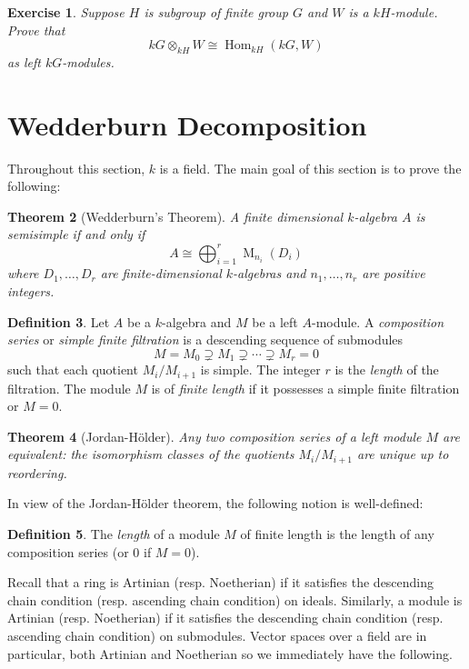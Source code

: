 \documentclass[12pt]{article}
\theoremstyle{plain}
\newtheorem{theorem}{Theorem}[section]
\newtheorem{exercise}[theorem]{Exercise}
\theoremstyle{definition}
\newtheorem{definition}[theorem]{Definition}
\theoremstyle{remark}
\numberwithin{equation}{section}
\begin{document}
\begin{exercise}
Suppose $H$ is subgroup of finite group $G$ and $W$ is a $kH$-module.
Prove that
\[
kG \otimes_{kH} W \cong \operatorname{Hom}_{kH}(kG,W)
\]
as left $kG$-modules.
\end{exercise}

\section{Wedderburn Decomposition}

Throughout this section, $k$ is a field.
The main goal of this section is to prove the following:

\begin{theorem}[Wedderburn's Theorem] \label{thm:Wedderburn}
A finite dimensional $k$-algebra $A$ is \emph{semisimple}
if and only if
\[
A \cong \bigoplus_{i=1}^r \operatorname{M}_{n_i}(D_i)
\]
where $D_1, \ldots, D_r$ are finite-dimensional $k$-algebras
and $n_1,\ldots, n_r$ are positive integers.
\end{theorem}

\begin{definition}
Let $A$ be a $k$-algebra and $M$ be a left $A$-module.
A \emph{composition series} or \emph{simple finite filtration}
is a descending sequence of submodules
\[
M=M_0 \supsetneq M_1 \supsetneq \cdots \supsetneq M_r = 0
\]
such that each quotient $M_i/M_{i+1}$ is simple.
The integer $r$ is the \emph{length} of the filtration.
The module $M$ is of \emph{finite length} if it possesses a simple finite
filtration or $M=0$.
\end{definition}

\begin{theorem}[Jordan-H\"older]
Any two composition series of a left module $M$ are \emph{equivalent}:
the isomorphism classes of the quotients $M_i/M_{i+1}$
are unique up to reordering.
\end{theorem}

In view of the Jordan-H\"older theorem, the following notion is
well-defined:

\begin{definition}
The \emph{length} of a module $M$ of finite length is the length of any
composition series (or $0$ if $M=0$).
\end{definition}

Recall that a ring is Artinian (resp. Noetherian) if it satisfies the
descending chain condition (resp. ascending chain condition) on ideals.
Similarly, a module is Artinian (resp. Noetherian) if it satisfies the
descending chain condition (resp. ascending chain condition) on
submodules.  Vector spaces over a field are in particular, both Artinian
and Noetherian so we immediately have the following.
\end{document}
